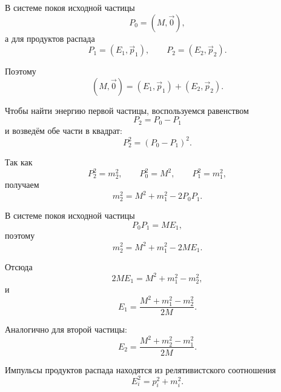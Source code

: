 \documentclass[../final.tex]{subfiles}
\begin{document}
В системе покоя исходной частицы
%
\begin{equation*}
    P_0
    =
    (M,\vec 0),
\end{equation*}
%
а для продуктов распада
%
\begin{equation*}
    P_1
    =
    (E_1,\vec p_1),
    \qquad
    P_2
    =
    (E_2,\vec p_2).
\end{equation*}

Поэтому
%
\begin{equation*}
    (M,\vec 0)
    =
    (E_1,\vec p_1)
    +
    (E_2,\vec p_2).
\end{equation*}

Чтобы найти энергию первой частицы, воспользуемся равенством
%
\begin{equation*}
    P_2=P_0-P_1
\end{equation*}
%
и возведём обе части в квадрат:
%
\begin{equation*}
    P_2^2
    =
    (P_0-P_1)^2.
\end{equation*}

Так как
%
\begin{equation*}
    P_2^2=m_2^2,
    \qquad
    P_0^2=M^2,
    \qquad
    P_1^2=m_1^2,
\end{equation*}
%
получаем
%
\begin{equation*}
    m_2^2
    =
    M^2+m_1^2-2P_0P_1.
\end{equation*}

В системе покоя исходной частицы
%
\begin{equation*}
    P_0P_1
    =
    ME_1,
\end{equation*}
%
поэтому
%
\begin{equation*}
    m_2^2
    =
    M^2+m_1^2-2ME_1.
\end{equation*}

Отсюда
%
\begin{equation*}
    2ME_1
    =
    M^2+m_1^2-m_2^2,
\end{equation*}
%
и
%
\begin{equation*}
    E_1
    =
    \frac{M^2+m_1^2-m_2^2}{2M}.
\end{equation*}

Аналогично для второй частицы:
%
\begin{equation*}
    E_2
    =
    \frac{M^2+m_2^2-m_1^2}{2M}.
\end{equation*}

Импульсы продуктов распада находятся из релятивистского соотношения
%
\begin{equation*}
    E_i^2
    =
    p_i^2+m_i^2.
\end{equation*}
\end{document}
